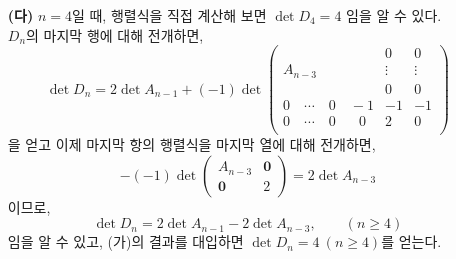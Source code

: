 \documentclass{article}
\begin{document}
\begin{itemize}
\begin{itemize}
		\item[\textbf{(다)}] $n=4$일 때, 행렬식을 직접 계산해 보면 $\det D_4 = 4$ 임을 알 수 있다. \\ $D_n$의 마지막 행에 대해 전개하면,
		$$
			\det D_n = 2\det A_{n-1} + (-1) \det \left(
			\begin{array}{c|cc}
				&0 & 0 \\
				A_{n-3}&\vdots &\vdots \\
				&0 &0 \\
				\hline
				0 \quad \cdots \quad 0 \quad -1 &-1 &-1 \\
				0\quad \cdots \quad 0 \quad ~~~0 &2 &0 \\
			\end{array}\right)
		$$ 을 얻고 이제 마지막 항의 행렬식을 마지막 열에 대해 전개하면,
		$$
			-(-1)\det \left( 
				\begin{array}{c|c}
				A_{n-3} & \mathbf{0} \\ \hline
				\mathbf{0} & 2
				\end{array}
			\right) = 2\det A_{n-3}
		$$ 이므로,
		$$\det D_n = 2 \det A_{n-1} - 2 \det A_{n-3}, \qquad (n \geq 4)$$
		임을 알 수 있고, (가)의 결과를 대입하면 $\det D_n = 4 \: (n \geq 4)$를 얻는다.
	\end{itemize}


\end{itemize}
\end{document}
